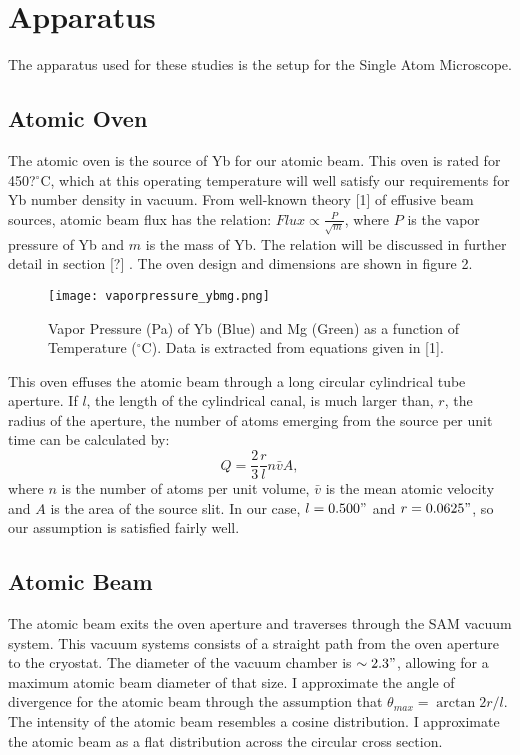 \documentclass[12pt, a4paper]{article}
\begin{document}
\section{Apparatus}
The apparatus used for these studies is the setup for the Single Atom Microscope. 
\subsection{Atomic Oven}
The atomic oven is the source of Yb for our atomic beam. This oven is rated for 450?$^{\circ}$C, which at this operating temperature will well satisfy our requirements for Yb number density in vacuum. From well-known theory [1] of effusive beam sources,  atomic beam flux has the relation: $Flux \propto \frac{P}{\sqrt{m}}$, where $P$ is the vapor pressure of Yb and $m$ is the mass of Yb. The relation will be discussed in further detail in section [?] . The oven design and dimensions are shown in figure 2. 


\begin{wrapfigure}{r}{0.45\textwidth}
  \texttt{[image: vaporpressure\_ybmg.png]}
  \vspace*{-3mm}
  \caption{Vapor Pressure (Pa) of Yb (Blue) and Mg (Green) as a function of Temperature ($^{\circ}$C). Data is extracted from equations given in [1].}
\end{wrapfigure}

This oven effuses the atomic beam through a long circular cylindrical tube aperture. If $l$, the length of the cylindrical canal, is much larger than, $r$, the radius of the aperture, the number of atoms emerging from the source per unit time can be calculated by:
\begin{equation}
Q = \frac{2}{3}\frac{r}{l}n\bar{v}A,
\end{equation}
where $n$ is the number of atoms per unit volume, $\bar{v}$ is the mean atomic velocity and $A$ is the area of the source slit. In our case, $l = 0.500"$ and $r = 0.0625"$, so our assumption is satisfied fairly well.

\subsection{Atomic Beam}
The atomic beam exits the oven aperture and traverses through the SAM vacuum system. This vacuum systems consists of a straight path from the oven aperture to the cryostat. The diameter of the vacuum chamber is $\sim 2.3"$, allowing for a maximum atomic beam diameter of that size. I approximate the angle of divergence for the atomic beam through the assumption that $\theta_{max} = \arctan{2r/l}$. The intensity of the atomic beam resembles a cosine distribution. I approximate the atomic beam as a flat distribution across the circular cross section.
\end{document}
